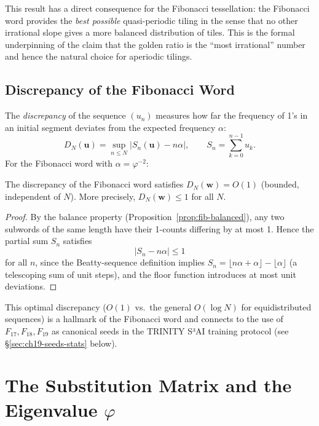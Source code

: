 This result has a direct consequence for the Fibonacci tessellation:
the Fibonacci word provides the \emph{best possible} quasi-periodic
tiling in the sense that no other irrational slope gives a more
balanced distribution of tiles.  This is the formal underpinning
of the claim that the golden ratio is the ``most irrational'' number
and hence the natural choice for aperiodic tilings.

\subsection{Discrepancy of the Fibonacci Word}
\label{subsec:ch19-discrepancy}

The \emph{discrepancy} of the sequence \((u_n)\) measures how far
the frequency of 1's in an initial segment deviates from the expected
frequency \(\alpha\):
\[
  D_N(\mathbf{u}) = \sup_{n\leq N} \bigl|S_n(\mathbf{u}) - n\alpha\bigr|,
  \qquad S_n = \sum_{k=0}^{n-1} u_k.
\]
For the Fibonacci word with \(\alpha=\varphi^{-2}\):

\begin{proposition}%
  \label{prop:discrepancy}
  The discrepancy of the Fibonacci word satisfies
  \(D_N(\mathbf{w}) = O(1)\) (bounded, independent of \(N\)).
  More precisely, \(D_N(\mathbf{w})\leq 1\) for all \(N\).
\end{proposition}
\begin{proof}
  By the balance property (Proposition~\ref{prop:fib-balanced}),
  any two subwords of the same length have their 1-counts differing
  by at most 1.  Hence the partial sum \(S_n\) satisfies
  \[
    |S_n - n\alpha| \leq 1
  \]
  for all \(n\), since the Beatty-sequence definition implies
  \(S_n = \lfloor n\alpha+\alpha\rfloor - \lfloor \alpha\rfloor\)
  (a telescoping sum of unit steps), and the floor function
  introduces at most unit deviations.
\end{proof}

This optimal discrepancy (\(O(1)\) vs.\ the general \(O(\log N)\)
for equidistributed sequences) is a hallmark of the Fibonacci word
and connects to the use of \(F_{17},F_{18},F_{19}\) as canonical
seeds in the TRINITY S³AI training protocol
(see \S\ref{sec:ch19-seeds-stats} below).

\section{The Substitution Matrix and the Eigenvalue \(\varphi\)}
\label{sec:ch19-substitution-matrix}

